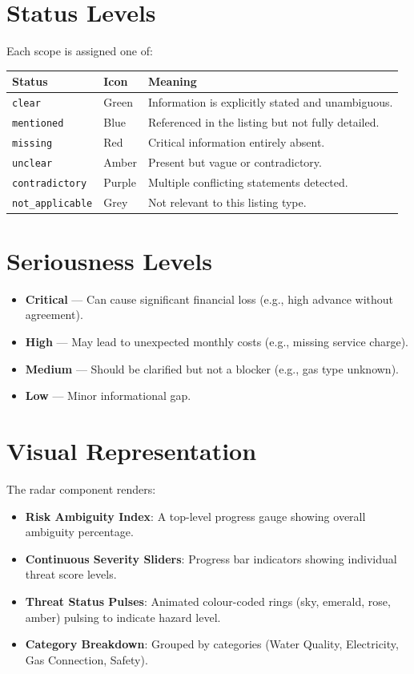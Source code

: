 \documentclass[12pt, a4paper, oneside]{report}
\begin{document}
\section{Status Levels}

Each scope is assigned one of:

\begin{longtable}{p{3.5cm} p{3cm} p{6.5cm}}
\toprule
\textbf{Status} & \textbf{Icon} & \textbf{Meaning} \\
\midrule
\endhead
\texttt{clear} & Green & Information is explicitly stated and unambiguous. \\
\texttt{mentioned} & Blue & Referenced in the listing but not fully detailed. \\
\texttt{missing} & Red & Critical information entirely absent. \\
\texttt{unclear} & Amber & Present but vague or contradictory. \\
\texttt{contradictory} & Purple & Multiple conflicting statements detected. \\
\texttt{not\_applicable} & Grey & Not relevant to this listing type. \\
\bottomrule
\end{longtable}

\section{Seriousness Levels}

\begin{itemize}[leftmargin=2em]
  \item \textbf{Critical} --- Can cause significant financial loss (e.g., high advance without agreement).
  \item \textbf{High} --- May lead to unexpected monthly costs (e.g., missing service charge).
  \item \textbf{Medium} --- Should be clarified but not a blocker (e.g., gas type unknown).
  \item \textbf{Low} --- Minor informational gap.
\end{itemize}

\section{Visual Representation}

The radar component renders:

\begin{itemize}[leftmargin=2em]
  \item \textbf{Risk Ambiguity Index}: A top-level progress gauge showing overall ambiguity percentage.
  \item \textbf{Continuous Severity Sliders}: Progress bar indicators showing individual threat score levels.
  \item \textbf{Threat Status Pulses}: Animated colour-coded rings (sky, emerald, rose, amber) pulsing to indicate hazard level.
  \item \textbf{Category Breakdown}: Grouped by categories (Water Quality, Electricity, Gas Connection, Safety).
\end{itemize}
\end{document}
